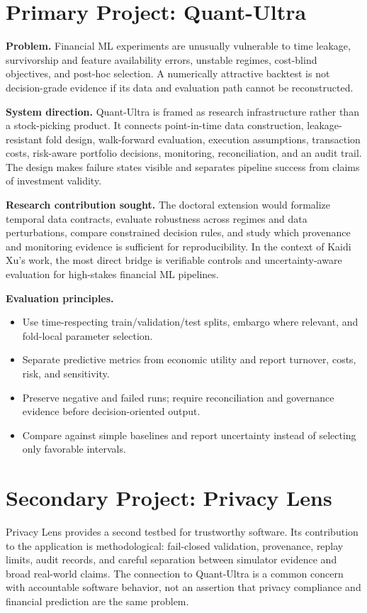 \documentclass[11pt]{article}
\begin{document}
\section*{Primary Project: Quant-Ultra}
\textbf{Problem.} Financial ML experiments are unusually vulnerable to time leakage, survivorship and feature availability errors, unstable regimes, cost-blind objectives, and post-hoc selection. A numerically attractive backtest is not decision-grade evidence if its data and evaluation path cannot be reconstructed.

\textbf{System direction.} Quant-Ultra is framed as research infrastructure rather than a stock-picking product. It connects point-in-time data construction, leakage-resistant fold design, walk-forward evaluation, execution assumptions, transaction costs, risk-aware portfolio decisions, monitoring, reconciliation, and an audit trail. The design makes failure states visible and separates pipeline success from claims of investment validity.

\textbf{Research contribution sought.} The doctoral extension would formalize temporal data contracts, evaluate robustness across regimes and data perturbations, compare constrained decision rules, and study which provenance and monitoring evidence is sufficient for reproducibility. In the context of Kaidi Xu's work, the most direct bridge is verifiable controls and uncertainty-aware evaluation for high-stakes financial ML pipelines.

\textbf{Evaluation principles.}
\begin{itemize}
\item Use time-respecting train/validation/test splits, embargo where relevant, and fold-local parameter selection.
\item Separate predictive metrics from economic utility and report turnover, costs, risk, and sensitivity.
\item Preserve negative and failed runs; require reconciliation and governance evidence before decision-oriented output.
\item Compare against simple baselines and report uncertainty instead of selecting only favorable intervals.
\end{itemize}

\section*{Secondary Project: Privacy Lens}
Privacy Lens provides a second testbed for trustworthy software. Its contribution to the application is methodological: fail-closed validation, provenance, replay limits, audit records, and careful separation between simulator evidence and broad real-world claims. The connection to Quant-Ultra is a common concern with accountable software behavior, not an assertion that privacy compliance and financial prediction are the same problem.
\end{document}
